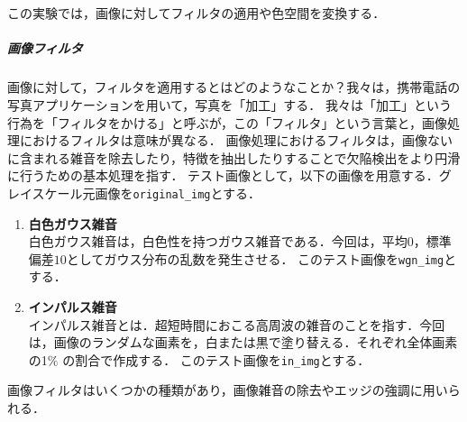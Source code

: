\chapter{\kadaib}
\section{\purpose}
この実験では，画像に対してフィルタの適用や色空間を変換する．\par
\paragraph{画像フィルタ} 画像に対して，フィルタを適用するとはどのようなことか？我々は，携帯電話の写真アプリケーションを用いて，写真を「加工」する．
我々は「加工」という行為を「フィルタをかける」と呼ぶが，この「フィルタ」という言葉と，画像処理におけるフィルタは意味が異なる．
画像処理におけるフィルタは，画像ないに含まれる雑音を除去したり，特徴を抽出したりすることで欠陥検出をより円滑に行うための基本処理を指す\cite{画像フィルタ}．
\newcommand{\originimg}{\texttt{original\_img}}
\newcommand{\wgnimg}{\texttt{wgn\_img}}
\newcommand{\inimg}{\texttt{in\_img}}
テスト画像として，以下の画像を用意する．グレイスケール元画像を\originimg とする．
\setlength{\columnseprule}{0.1mm}
\begin{enumerate}
    \item \textbf{白色ガウス雑音}\\
          白色ガウス雑音は，白色性を持つガウス雑音である．今回は，平均\(0\)，標準偏差\(10\)としてガウス分布の乱数を発生させる．
          このテスト画像を\wgnimg とする．
    \item \textbf{インパルス雑音}\\
          インパルス雑音とは．超短時間におこる高周波の雑音のことを指す．今回は，画像のランダムな画素を，白または黒で塗り替える．それぞれ全体画素の1\(\%\) の割合で作成する．
          このテスト画像を\inimg とする．
\end{enumerate}
画像フィルタはいくつかの種類があり，画像雑音の除去やエッジの強調に用いられる．
